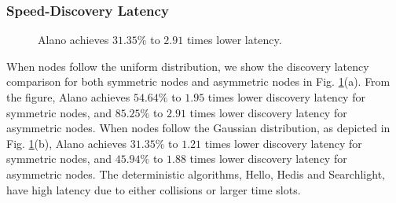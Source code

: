 \subsubsection{Speed-Discovery Latency}

\begin{figure}[!h]
\centering
{}
\hspace{0.01in}
\caption{Alano achieves $31.35\%$ to $2.91$ times lower latency.}
\label{fig_latency}
\end{figure}


When nodes follow the uniform distribution, we show the discovery latency
comparison for both symmetric nodes and asymmetric nodes in Fig.
\ref{fig_latency}(a).
From the figure, Alano achieves $54.64\%$ to $1.95$ times lower
discovery latency for symmetric nodes, and $85.25\%$ to $2.91$ times
lower discovery latency for asymmetric nodes.
When nodes follow the Gaussian distribution, as depicted in Fig.
\ref{fig_latency}(b),
Alano achieves $31.35\%$ to $1.21$ times lower discovery latency for symmetric nodes, 
and $45.94\%$ to $1.88$ times lower discovery latency for asymmetric nodes.
The deterministic algorithms, Hello, Hedis and Searchlight, have high
latency due to either collisions or larger time slots.



